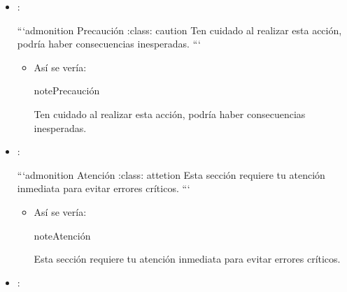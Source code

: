 \documentclass[a4paper,10pt,oneside,spanish,openany]{sphinxmanual}
\begin{document}
\begin{itemize}
\begin{itemize}
\begin{sphinxadmonition}{note}{Peligroso}
\sphinxAtStartPar
¡Atención! Esta acción puede ser peligrosa.
\end{sphinxadmonition}

\end{itemize}

\item {} 
\sphinxAtStartPar
{}:

\begin{sphinxVerbatim}[commandchars=\\\{\}]
  ```\PYGZob{}admonition\PYGZcb{} Precaución :class: caution Ten cuidado al realizar esta acción, podría haber consecuencias inesperadas. ```
\end{sphinxVerbatim}
\begin{itemize}
\item {} 
\sphinxAtStartPar
Así se vería:

\begin{sphinxadmonition}{note}{Precaución}

\sphinxAtStartPar
Ten cuidado al realizar esta acción, podría haber consecuencias inesperadas.
\end{sphinxadmonition}

\end{itemize}

\item {} 
\sphinxAtStartPar
{}:

\begin{sphinxVerbatim}[commandchars=\\\{\}]
  ```\PYGZob{}admonition\PYGZcb{} Atención :class: attetion Esta sección requiere tu atención inmediata para evitar errores críticos. ```
\end{sphinxVerbatim}
\begin{itemize}
\item {} 
\sphinxAtStartPar
Así se vería:

\begin{sphinxadmonition}{note}{Atención}

\sphinxAtStartPar
Esta sección requiere tu atención inmediata para evitar errores críticos.
\end{sphinxadmonition}

\end{itemize}

\item {} 
\sphinxAtStartPar
{}:


\end{itemize}
\end{document}
